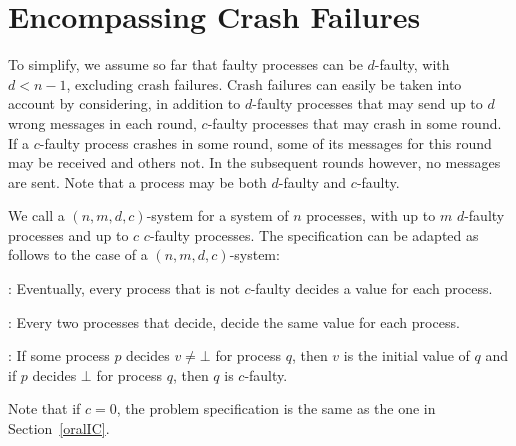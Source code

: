\section{Encompassing Crash Failures}\label{crash}
To simplify, we assume so far that faulty processes can be 
$d$-faulty, with $d < n-1$, excluding crash failures. 
Crash failures  can easily be taken into account by considering, in addition to $d$-faulty processes that may send up to $d$ wrong messages in each round, 
$c$-faulty processes that may crash in some round. If a
$c$-faulty process crashes in some round, some of its messages for this round
may be received and  others not. In the subsequent rounds however, no messages are 
sent.   Note that a process may be both $d$-faulty and $c$-faulty.

We call a $( n,m,d,c )$-system for a system of $n$ processes, with up to $m$
$d$-faulty processes and up to $c$ $c$-faulty processes.
The   specification can be adapted as follows to the 
case of a  $( n,m,d,c)$-system:
  \begin{itemizedot}
    \item {}: Eventually, every process that is not $c$-faulty
     decides a value for each process.
    
    \item {}: Every two processes that decide,
    decide the same value for each process.
    
    \item {}: If some process $p$ decides $v\neq \bot $ for process $q$, then
           $v$ is the initial value of $q$ and if $p$ decides $\bot$
           for process $q$, then $q$ is $c$-faulty.
  \end{itemizedot}
Note that if $c=0$,  the problem specification is the same as
the one in Section~\ref{oralIC}.

